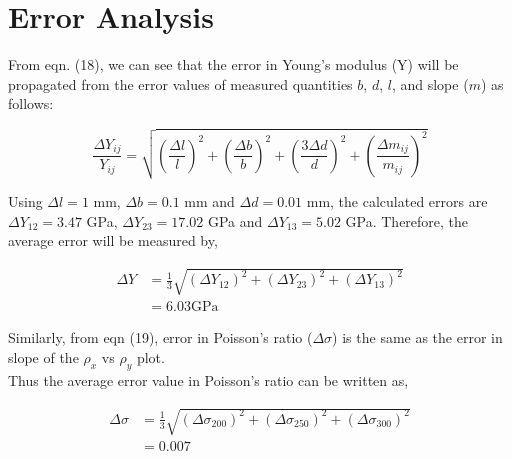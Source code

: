 \section{Error Analysis}
From eqn. (18), we can see that the error in Young's modulus (Y) will be propagated from the error values of measured quantities $b$, $d$, $l$, and slope ($m$) as follows:

\begin{equation*}
    \frac{\Delta Y_{ij}}{Y_{ij}} = \sqrt{\left(\frac{\Delta l}{l}\right)^2 + \left(\frac{\Delta b}{b}\right)^2 + \left(\frac{3\Delta d}{d}\right)^2 + \left(\frac{\Delta m_{ij}}{m_{ij}}\right)^2}
\end{equation*}

Using $\Delta l = 1$ mm, $\Delta b = 0.1$ mm and $\Delta d = 0.01$ mm, the calculated errors are $\Delta Y_{12} = 3.47$ GPa, $\Delta Y_{23} = 17.02$ GPa and $\Delta Y_{13} = 5.02$ GPa. Therefore, the average error will be measured by,

\begin{align*}
    \Delta Y &= \frac{1}{3}\sqrt{(\Delta Y_{12})^2 + (\Delta Y_{23})^2 + (\Delta Y_{13})^2} \\
    &= 6.03 \text{GPa}
\end{align*}

Similarly, from eqn (19), error in Poisson's ratio ($\Delta \sigma$) is the same as the error in slope of the $\rho_x$ vs $\rho_y$ plot.\\
Thus the average error value in Poisson's ratio can be written as,

\begin{align*}
    \Delta \sigma &= \frac{1}{3}\sqrt{(\Delta \sigma_{200})^2 + (\Delta \sigma_{250})^2 + (\Delta \sigma_{300})^2} \\
    &= 0.007
\end{align*}